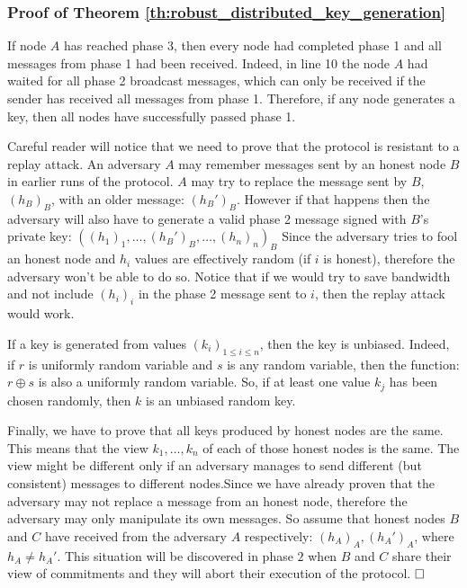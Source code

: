 \subsubsection{Proof of Theorem \ref{th:robust_distributed_key_generation}}

If node $A$ has reached phase 3, then every node had completed phase 1
and all messages from phase 1 had been received. Indeed, in line 10 the node $A$
had waited for all phase 2 broadcast messages, which can only be received if
the sender has received all messages from phase 1.
Therefore, if any node generates a key, then all nodes have successfully passed
phase 1.

Careful reader will notice that we need to prove that the protocol is resistant
to a replay attack. An adversary $A$ may remember messages sent by an honest
node $B$ in earlier runs of the protocol. $A$ may try to replace the message
sent by $B$, $\left(h_B\right)_B$, with an older message: $\left(h_B'\right)_B$.
However if that happens then the adversary will also have to generate a valid
phase 2 message signed with $B$'s private key: 
$\left(\left(h_1\right)_1, \ldots, \left(h_B'\right)_B, \ldots,
\left(h_n\right)_n\right)_B$
Since the adversary tries to fool an honest node and $h_i$ values are
effectively random (if $i$ is honest), therefore the adversary won't be able to
do so.
Notice that if we would try to save bandwidth and not include
$\left(h_i\right)_i$ in the phase 2 message sent to $i$, then the replay attack
would work.

If a key is generated from values $\left(k_i\right)_{1 \leq i \leq n}$, then the
key is unbiased. Indeed, if $r$ is uniformly random variable and $s$ is any
random variable, then the function: $r \oplus s$ is also a uniformly random
variable.
So, if at least one value $k_j$ has been chosen randomly, then $k$ is an
unbiased random key.

Finally, we have to prove that all keys produced by honest nodes are the same.
This means that the view $k_1, \ldots, k_n$ of each of those honest nodes is the
same. The view might be different only if an adversary manages to send different
(but consistent) messages to different nodes.Since we have already proven that the
adversary may not replace a message from an honest node, therefore the adversary
may only manipulate its own messages. So assume that honest nodes $B$
and $C$ have received from the adversary $A$ respectively:
$\left(h_A\right)_A, \left(h_A'\right)_A$, where $h_A \neq h_A'$.
This situation will be discovered in phase $2$ when $B$ and $C$ share their view
of commitments and they will abort their execution of the protocol.
$\hfill\square$

